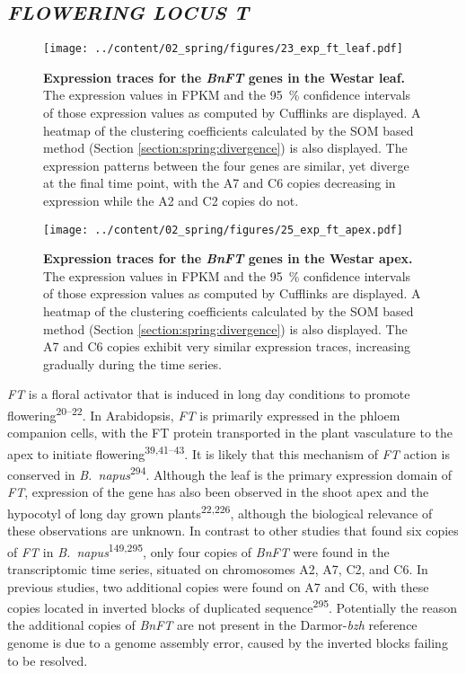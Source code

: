 \documentclass[12pt,]{book}
\begin{document}
\subsection{\texorpdfstring{\emph{FLOWERING LOCUS
T}}{FLOWERING LOCUS T}}\label{section:spring:ft}

\begin{figure}[htbp]
\centering
\texttt{[image: ../content/02\_spring/figures/23\_exp\_ft\_leaf.pdf]}
\caption{\textbf{Expression traces for the \emph{BnFT} genes in the
Westar leaf.} The expression values in FPKM and the 95~\% confidence
intervals of those expression values as computed by Cufflinks are
displayed. A heatmap of the clustering coefficients calculated by the
SOM based method (Section \ref{section:spring:divergence}) is also
displayed. The expression patterns between the four genes are similar,
yet diverge at the final time point, with the A7 and C6 copies
decreasing in expression while the A2 and C2 copies do
not.}\label{figure:223:ftleaf}
\end{figure}

\begin{figure}[htbp]
\centering
\texttt{[image: ../content/02\_spring/figures/25\_exp\_ft\_apex.pdf]}
\caption{\textbf{Expression traces for the \emph{BnFT} genes in the
Westar apex.} The expression values in FPKM and the 95~\% confidence
intervals of those expression values as computed by Cufflinks are
displayed. A heatmap of the clustering coefficients calculated by the
SOM based method (Section \ref{section:spring:divergence}) is also
displayed. The A7 and C6 copies exhibit very similar expression traces,
increasing gradually during the time series.}\label{figure:225:ftapex}
\end{figure}

\emph{FT} is a floral activator that is induced in long day conditions
to promote flowering\textsuperscript{20--22}. In Arabidopsis, \emph{FT}
is primarily expressed in the phloem companion cells, with the FT
protein transported in the plant vasculature to the apex to initiate
flowering\textsuperscript{39,41--43}. It is likely that this mechanism
of \emph{FT} action is conserved in
\emph{B.~napus}\textsuperscript{294}. Although the leaf is the primary
expression domain of \emph{FT}, expression of the gene has also been
observed in the shoot apex and the hypocotyl of long day grown
plants\textsuperscript{22,226}, although the biological relevance of
these observations are unknown. In contrast to other studies that found
six copies of \emph{FT} in \emph{B.~napus}\textsuperscript{149,295},
only four copies of \emph{BnFT} were found in the transcriptomic time
series, situated on chromosomes A2, A7, C2, and C6. In previous studies,
two additional copies were found on A7 and C6, with these copies located
in inverted blocks of duplicated sequence\textsuperscript{295}.
Potentially the reason the additional copies of \emph{BnFT} are not
present in the Darmor-\emph{bzh} reference genome is due to a genome
assembly error, caused by the inverted blocks failing to be resolved.
\end{document}
